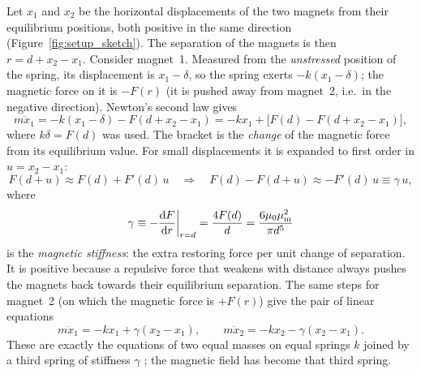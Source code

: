 Let $x_1$ and $x_2$ be the horizontal displacements of the two magnets from their equilibrium positions, both positive in the same direction (Figure~\ref{fig:setup_sketch}). The separation of the magnets is then $r=d+x_2-x_1$. Consider magnet~1. Measured from the \emph{unstressed} position of the spring, its displacement is $x_1-\delta$, so the spring exerts $-k(x_1-\delta)$; the magnetic force on it is $-F(r)$ (it is pushed away from magnet~2, i.e.\ in the negative direction). Newton's second law gives
\begin{equation}
m\ddot x_1=-k(x_1-\delta)-F(d+x_2-x_1)=-kx_1+\big[F(d)-F(d+x_2-x_1)\big],
\end{equation}
where $k\delta=F(d)$ was used. The bracket is the \emph{change} of the magnetic force from its equilibrium value. For small displacements it is expanded to first order in $u=x_2-x_1$:
\begin{equation}
F(d+u)\approx F(d)+F'(d)\,u\quad\Rightarrow\quad F(d)-F(d+u)\approx-F'(d)\,u\equiv\gamma\,u ,
\end{equation}
where
\begin{equation}
\gamma\equiv-\frac{\mathrm{d} F}{\mathrm{d} r}\bigg|_{r=d}=\frac{4F(d)}{d}=\frac{6\mu_0\mu_{\mathrm m}^2}{\pi d^5}
\label{eq:gamma}
\end{equation}
is the \emph{magnetic stiffness}: the extra restoring force per unit change of separation. It is positive because a repulsive force that weakens with distance always pushes the magnets back towards their equilibrium separation. The same steps for magnet~2 (on which the magnetic force is $+F(r)$) give the pair of linear equations
\begin{equation}
m\ddot x_1=-kx_1+\gamma(x_2-x_1),\qquad
m\ddot x_2=-kx_2-\gamma(x_2-x_1).
\label{eq:eom}
\end{equation}
These are exactly the equations of two equal masses on equal springs $k$ joined by a third spring of stiffness $\gamma$ \cite{taylor}; the magnetic field has become that third spring.

